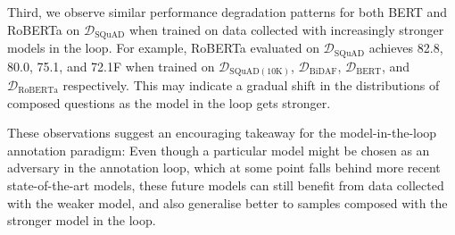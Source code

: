 \documentclass[11pt,a4paper]{article}
\newcommand{\dataset}[1]{\ensuremath{\mathcal{D_{\mathrm{#1}}}}}
\begin{document}
Third, we observe similar performance degradation patterns for both BERT and RoBERTa on \dataset{SQuAD} when trained on data collected with increasingly stronger models in the loop. For example, RoBERTa evaluated on \dataset{SQuAD} achieves 82.8, 80.0, 75.1, and 72.1F when trained on \dataset{SQuAD(10K)}, \dataset{BiDAF}, \dataset{BERT}, and \dataset{RoBERTa} respectively. This may indicate a gradual shift in the distributions of composed questions as the model in the loop gets stronger.


These observations suggest an encouraging takeaway for the model-in-the-loop annotation paradigm: 
Even though a particular model might be chosen as an adversary in the annotation loop, which at some point falls behind more recent state-of-the-art models, these future models can still benefit from data collected with the weaker model, and also generalise better to samples composed with the stronger model in the loop.
\end{document}

